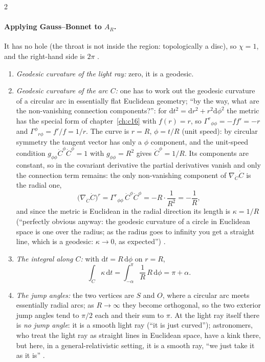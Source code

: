 \begin{paracol}{2}
\paragraph{Applying Gauss--Bonnet to $A_R$.} It has no hole (the throat is not inside the region: topologically a disc), so $\chi=1$, and the right-hand side is $2\pi$ .
\begin{enumerate}
  \item \emph{Geodesic curvature of the light ray:} zero, it is a geodesic.
  \item \emph{Geodesic curvature of the arc $C$:} one has to work out the geodesic curvature of a circular arc in essentially flat Euclidean geometry; ``by the way, what are the non-vanishing connection components?'': for $\mathrm dt^2=\mathrm dr^2+r^2\mathrm d\phi^2$ the metric has the special form of chapter~\ref{ch:c16} with $f(r)=r$, so $\Gamma^r{}_{\phi\phi}=-f f'=-r$ and $\Gamma^\phi{}_{r\phi}=f'/f=1/r$. The curve is $r=R$, $\phi=t/R$ (unit speed): by circular symmetry the tangent vector has only a $\phi$ component, and the unit-speed condition $g_{\phi\phi}\dot C^\phi\dot C^\phi=1$ with $g_{\phi\phi}=R^2$ gives $\dot C^\phi=1/R$. Its components are constant, so in the covariant derivative the partial derivatives vanish and only the connection term remains: the only non-vanishing component of $\nabla_{\dot C}\dot C$ is the radial one,
    \[
      \bigl(\nabla_{\dot C}\dot C\bigr)^r=\Gamma^r{}_{\phi\phi}\,\dot C^\phi\dot C^\phi=-R\cdot\frac1{R^2}=-\frac1R,
    \]
    and since the metric is Euclidean in the radial direction its length is $\kappa=1/R$ (``perfectly obvious anyway: the geodesic curvature of a circle in Euclidean space is one over the radius; as the radius goes to infinity you get a straight line, which is a geodesic: $\kappa\to0$, as expected'') .
  \item \emph{The integral along $C$:} with $\mathrm dt=R\,\mathrm d\phi$ on $r=R$,
    \[
      \int_C\kappa\,\mathrm dt=\int_{-\alpha}^{\pi}\frac1R\,R\,\mathrm d\phi=\pi+\alpha.
    \]
  \item \emph{The jump angles:} the two vertices are $S$ and $O$, where a circular arc meets essentially radial arcs; as $R\to\infty$ they become orthogonal, so the two exterior jump angles tend to $\pi/2$ each and their sum to $\pi$. At the light ray itself there is \emph{no jump angle}: it is a smooth light ray (``it is just curved''); astronomers, who treat the light ray as straight lines in Euclidean space, have a kink there, but here, in a general-relativistic setting, it is a smooth ray, ``we just take it as it is'' .

\end{enumerate}
\end{paracol}

